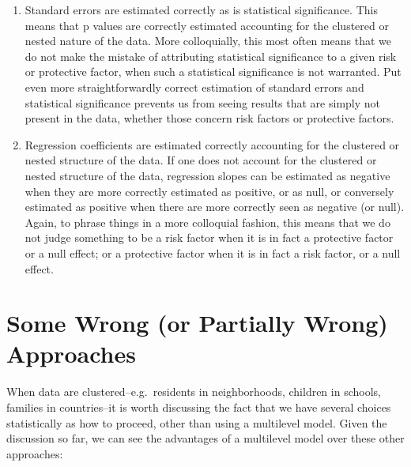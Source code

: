\documentclass[
  letterpaper,
  DIV=11,
  numbers=noendperiod]{scrreprt}
\providecommand{\tightlist}{%
  \setlength{\itemsep}{0pt}\setlength{\parskip}{0pt}}\usepackage{longtable,booktabs,array}
\begin{document}
\begin{enumerate}
\def\labelenumi{\arabic{enumi}.}
\tightlist
\item
  Standard errors are estimated correctly as is statistical
  significance. This means that p values are correctly estimated
  accounting for the clustered or nested nature of the data. More
  colloquially, this most often means that we do not make the mistake of
  attributing statistical significance to a given risk or protective
  factor, when such a statistical significance is not warranted. Put
  even more straightforwardly correct estimation of standard errors and
  statistical significance prevents us from seeing results that are
  simply not present in the data, whether those concern risk factors or
  protective factors.
\item
  Regression coefficients are estimated correctly accounting for the
  clustered or nested structure of the data. If one does not account for
  the clustered or nested structure of the data, regression slopes can
  be estimated as negative when they are more correctly estimated as
  positive, or as null, or conversely estimated as positive when there
  are more correctly seen as negative (or null). Again, to phrase things
  in a more colloquial fashion, this means that we do not judge
  something to be a risk factor when it is in fact a protective factor
  or a null effect; or a protective factor when it is in fact a risk
  factor, or a null effect.
\end{enumerate}

\section{Some Wrong (or Partially Wrong)
Approaches}\label{sec-wrongapproaches}

When data are clustered--e.g.~residents in neighborhoods, children in
schools, families in countries--it is worth discussing the fact that we
have several choices statistically as how to proceed, other than using a
multilevel model. Given the discussion so far, we can see the advantages
of a multilevel model over these other approaches:
\end{document}

